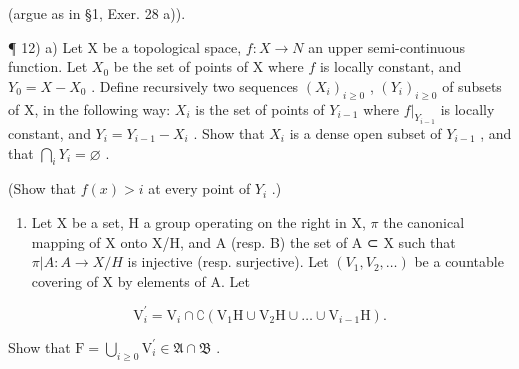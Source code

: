 (argue as in §1, Exer. 28 a)).

¶ 12) a) Let X be a topological space, \(f: X \to N\) an upper semi-continuous function. Let \(X_0\) be the set of points of X where \(f\) is locally constant, and \(Y_0 = X - X_0\) . Define recursively two sequences \((X_i)_{i \geqslant 0}\) , \((Y_i)_{i \geqslant 0}\) of subsets of X, in the following way: \(X_i\) is the set of points of \(Y_{i-1}\) where \(f|_{Y_{i-1}}\) is locally constant, and \(Y_i = Y_{i-1} - X_i\) . Show that \(X_i\) is a dense open subset of \(Y_{i-1}\) , and that \(\bigcap_i Y_i = \varnothing\) .

(Show that \(f(x) > i\) at every point of \(Y_i\) .)

\begin{enumerate}
\def\labelenumi{\alph{enumi})}
\setcounter{enumi}{1}
\tightlist
\item
  Let X be a set, H a group operating on the right in X, \(\pi\) the canonical mapping of X onto X/H, and A (resp. B) the set of A ⊂ X such that \(\pi|A:A\to X/H\) is injective (resp. surjective). Let \((V_{1},V_{2},\ldots)\) be a countable covering of X by elements of A. Let
\end{enumerate}

\[
\mathrm{V} _ {i} ^ {\prime} = \mathrm{V} _ {i} \cap \complement \left(\mathrm{V} _ {1} \mathrm{H} \cup \mathrm{V} _ {2} \mathrm{H} \cup \dots \cup \mathrm{V} _ {i - 1} \mathrm{H}\right).
\]

Show that \(\mathrm{F} = \bigcup_{i\geqslant 0}\mathrm{V}_i^\prime \in \mathfrak{A}\cap \mathfrak{B}\) .


